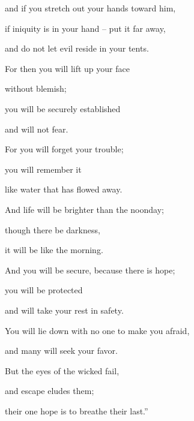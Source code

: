 {\par }{\Q and if you
stretch
out your hands toward him,
\par }{\Q {}if
iniquity
is in your hand
– put it far
away,

\par }{\Q and do not
let evil
reside
in your tents.
\par }{\Q {}For
then
you will lift
up your face
\par }{\Q without blemish;
\par }{\Q you will be
securely
established

\par }{\Q and will not
fear.
\par }{\Q {}For
you
will forget
your trouble;
\par }{\Q you will remember
it
\par }{\Q like water
that has flowed away.
\par }{\Q {}And life will be brighter than the noonday;
\par }{\Q though there be darkness,

\par }{\Q it will be
like
the morning.
\par }{\Q {}And you will be secure,
because
there is
hope;
\par }{\Q you will be protected
\par }{\Q and will take
your rest
in safety.
\par }{\Q {}You will lie
down with no
one to make you afraid,
\par }{\Q and many
will seek your favor.
\par }{\Q {}But the eyes
of the wicked
fail,
\par }{\Q and escape
eludes
them;
\par }{\Q their one hope
is to breathe their last.”


\par }
